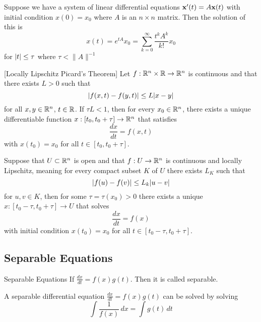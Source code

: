 \documentclass[a4paper]{article}
\begin{document}
\begin{thm}{}{} Suppose we have a system of linear differential equations $\vb{x}'(t)=A\vb{x}(t)$ with initial condition $x(0)=x_0$ where $A$ is an $n\times n$ matrix. Then the solution of this is $$x(t)=e^{tA}x_0=\sum_{k=0}^\infty\frac{t^kA^k}{k!}x_0$$ for $\abs{t}\leq\tau$ where $\tau<\|A\|^{-1}$
\end{thm}

\begin{thm}{}{}[Locally Lipschitz Picard's Theorem] Let $f:\mathbb{R}^n\times\mathbb{R}\to\mathbb{R}^n$ is continuous and that there exists $L>0$ such that $$\abs{f(x,t)-f(y,t)}\leq L\abs{x-y}$$ for all $x,y\in\mathbb{R}^n$, $t\in\mathbb{R}$.  If $\tau L<1$, then for every $x_0\in\mathbb{R}^n$, there exists a unique differentiable function $x:[t_0,t_0+\tau]\to\mathbb{R}^n$ that satisfies $$\frac{dx}{dt}=f(x,t)$$ with $x(t_0)=x_0$ for all $t\in[t_0,t_0+\tau]$. 
\end{thm}

\begin{thm}{}{} Suppose that $U\subset\mathbb{R}^n$ is open and that $f:U\to\mathbb{R}^n$ is continuous and locally Lipschitz, meaning for every compact subset $K$ of $U$ there exists $L_K$ such that $$\abs{f(u)-f(v)}\leq L_k\abs{u-v}$$ for $u,v\in K$, then for some $\tau=\tau(x_0)>0$ there exists a unique $x:[t_0-\tau,t_0+\tau]\to U$ that solves $$\frac{dx}{dt}=f(x)$$ with initial condition $x(t_0)=x_0$ for all $t\in[t_0-\tau,t_0+\tau]$. 
\end{thm}

\subsection{Separable Equations}
\begin{defn}{Separable Equations}{} If $\frac{dx}{dt}=f(x)g(t)$. Then it is called separable. 
\end{defn}

\begin{lmm}{}{} A separable differential equation $\frac{dx}{dt}=f(x)g(t)$ can be solved by solving $$\int\frac{1}{f(x)}\,dx=\int g(t)\,dt$$
\end{lmm}
\end{document}
